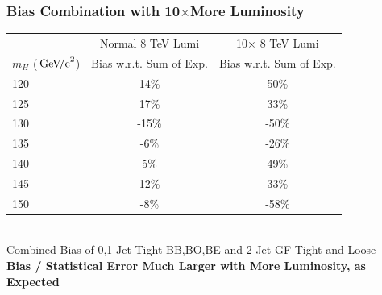 \documentclass{beamer}
\newcommand{\GeVcc}{\ensuremath{\,\mathrm{Ge\kern -0.1em V\!/c}^2}}
\begin{document}
\begin{frame}
\frametitle{Bias Combination with 10$\times$More Luminosity}
  \begin{center}
    \scriptsize
    \begin{tabular}{|l|c|c|} \hline
 & Normal 8 TeV Lumi & 10$\times$ 8 TeV Lumi \\
$m_H$ (\GeVcc{})      & Bias w.r.t. Sum of Exp. &  Bias w.r.t. Sum of Exp. \\ \hline \hline
       120    & 14\%   &     50\%    \\ \hline
       125    & 17\%   &     33\%    \\ \hline
       130    & -15\%  &    -50\%    \\ \hline
       135    & -6\%   &    -26\%    \\ \hline
       140    & 5\%    &     49\%    \\ \hline
       145    & 12\%   &     33\%    \\ \hline
       150    & -8\%   &    -58\%    \\ \hline
    \end{tabular}
    \\ Combined Bias of 0,1-Jet Tight BB,BO,BE and 2-Jet GF Tight and Loose 
  \small
  \\ \vspace{1em}
  \textbf{Bias / Statistical Error Much Larger with More Luminosity, as Expected}
  \end{center}
\end{frame}
\end{document}
